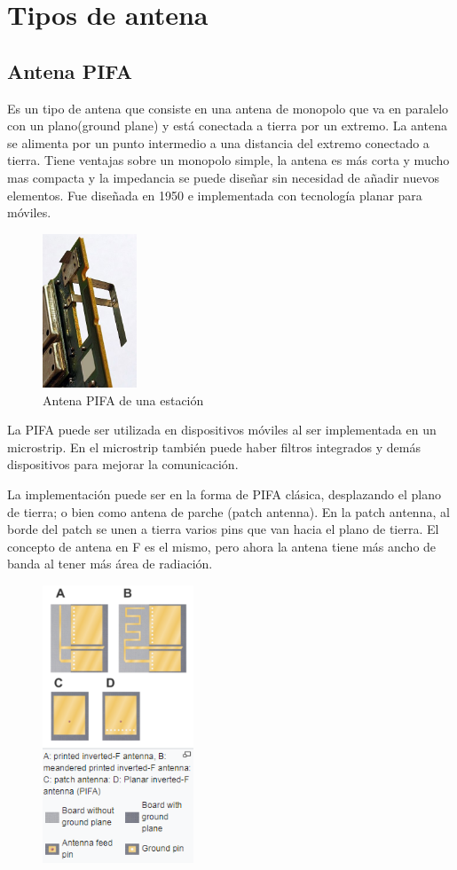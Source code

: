 \documentclass[a4paper,11pt,titlepage]{article}
\begin{document}
\section{Tipos de antena}
\subsection{Antena PIFA}
Es un tipo de antena que consiste en una antena de monopolo que va en paralelo con un plano(ground plane) y está conectada a tierra por un extremo. La antena se alimenta por un punto intermedio a una distancia del extremo conectado a tierra. Tiene ventajas sobre un monopolo simple, la antena es más corta y mucho mas compacta y la impedancia se puede diseñar sin necesidad de añadir nuevos elementos. Fue diseñada en 1950 e implementada con tecnología planar para móviles.
\begin{figure}[H]
\centering
\includegraphics[width=0.25\textwidth]{pifawiki}
\caption{Antena PIFA de una estación}
\end{figure}
La PIFA puede ser utilizada en dispositivos móviles al ser implementada en un microstrip. En el microstrip también puede haber filtros integrados y demás dispositivos para mejorar la comunicación.\par
La implementación puede ser en la forma de PIFA clásica, desplazando el plano de tierra; o bien como antena de parche (patch antenna). En la patch antenna, al borde del patch se unen a tierra varios pins que van hacia el plano de tierra. El concepto de antena en F es el mismo, pero ahora la antena tiene más ancho de banda al tener más área de radiación. 
\begin{figure}[H]
\centering
\includegraphics[width=0.4\textwidth]{pifaplanar}
\end{figure}
\end{document}
